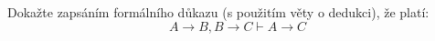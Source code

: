 \subsubsection{}
Dokažte zapsáním formálního důkazu (s použitím věty o dedukci), že platí:
$$A\rightarrow B, B\rightarrow C \vdash A\rightarrow C$$
